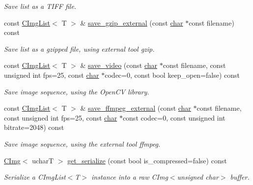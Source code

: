 \begin{DoxyCompactItemize}
\begin{DoxyCompactList}\small\item\em Save list as a T\+I\+FF file. \end{DoxyCompactList}\item 
const \hyperlink{structcimg__library__suffixed_1_1CImgList}{C\+Img\+List}$<$ T $>$ \& \hyperlink{structcimg__library__suffixed_1_1CImgList_aad5afe8b913e276dd281255dd787b4ba}{save\+\_\+gzip\+\_\+external} (const \hyperlink{classchar}{char} $\ast$const filename) const
\begin{DoxyCompactList}\small\item\em Save list as a gzipped file, using external tool \textquotesingle{}gzip\textquotesingle{}. \end{DoxyCompactList}\item 
const \hyperlink{structcimg__library__suffixed_1_1CImgList}{C\+Img\+List}$<$ T $>$ \& \hyperlink{structcimg__library__suffixed_1_1CImgList_a4fcada66102d9f9245f11d2127dbe8fb}{save\+\_\+video} (const \hyperlink{classchar}{char} $\ast$const filename, const unsigned int fps=25, const \hyperlink{classchar}{char} $\ast$codec=0, const bool keep\+\_\+open=false) const
\begin{DoxyCompactList}\small\item\em Save image sequence, using the Open\+CV library. \end{DoxyCompactList}\item 
const \hyperlink{structcimg__library__suffixed_1_1CImgList}{C\+Img\+List}$<$ T $>$ \& \hyperlink{structcimg__library__suffixed_1_1CImgList_af09a45345581747984f4df0607418f2c}{save\+\_\+ffmpeg\+\_\+external} (const \hyperlink{classchar}{char} $\ast$const filename, const unsigned int fps=25, const \hyperlink{classchar}{char} $\ast$const codec=0, const unsigned int bitrate=2048) const
\begin{DoxyCompactList}\small\item\em Save image sequence, using the external tool \textquotesingle{}ffmpeg\textquotesingle{}. \end{DoxyCompactList}\item 
\hyperlink{structcimg__library__suffixed_1_1CImg}{C\+Img}$<$ ucharT $>$ \hyperlink{structcimg__library__suffixed_1_1CImgList_a6ef5394483360f2220873d2b8b856789}{get\+\_\+serialize} (const bool is\+\_\+compressed=false) const
\begin{DoxyCompactList}\small\item\em Serialize a C\+Img\+List$<$\+T$>$ instance into a raw C\+Img$<$unsigned char$>$ buffer. \end{DoxyCompactList}\item 

\end{DoxyCompactItemize}
